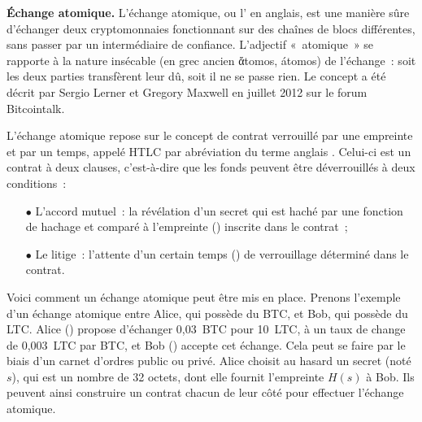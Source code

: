 \textbf{Échange atomique.} L'échange atomique, ou l' en anglais, est une manière sûre d'échanger deux cryptomonnaies fonctionnant sur des chaînes de blocs différentes, sans passer par un intermédiaire de confiance. L'adjectif «~atomique~» se rapporte à la nature insécable (en grec ancien \foreignlanguage{greek}{ἄtomos}, átomos) de l'échange~: soit les deux parties transfèrent leur dû, soit il ne se passe rien. Le concept a été décrit par Sergio Lerner et Gregory Maxwell en juillet 2012 sur le forum Bitcointalk.

L'échange atomique repose sur le concept de contrat verrouillé par une empreinte et par un temps, appelé HTLC par abréviation du terme anglais . Celui-ci est un contrat à deux clauses, c'est-à-dire que les fonds peuvent être déverrouillés à deux conditions~:

\begin{itemize}
\item[$\bullet$] L'accord mutuel~: la révélation d'un secret qui est haché par une fonction de hachage et comparé à l'empreinte () inscrite dans le contrat~;
\item[$\bullet$] Le litige~: l'attente d'un certain temps () de verrouillage déterminé dans le contrat.
\end{itemize}

%

Voici comment un échange atomique peut être mis en place. Prenons l'exemple d'un échange atomique entre Alice, qui possède du BTC, et Bob, qui possède du LTC. Alice () propose d'échanger 0,03~BTC pour 10~LTC, à un taux de change de 0,003~LTC par BTC, et Bob () accepte cet échange. Cela peut se faire par le biais d'un carnet d'ordres public ou privé. Alice choisit au hasard un secret (noté $s$), qui est un nombre de 32 octets, dont elle fournit l'empreinte $H(s)$ à Bob. Ils peuvent ainsi construire un contrat chacun de leur côté pour effectuer l'échange atomique.


